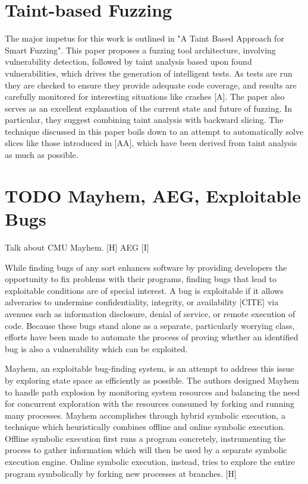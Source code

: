\documentclass[11pt,expanded,copyright]{fsuthesis}
\begin{document}
\section{Taint-based Fuzzing}

The major impetus for this work is outlined in "A Taint Based Approach for Smart Fuzzing". This paper proposes a fuzzing tool architecture, involving vulnerability detection, followed by taint analysis based upon found vulnerabilities, which drives the generation of intelligent tests. As tests are run they are checked to ensure they provide adequate code coverage, and results are carefully monitored for interesting situations like crashes [A]. The paper also serves as an excellent explanation of the current state and future of fuzzing. In particular, they suggest combining taint analysis with backward slicing. The technique discussed in this paper boils down to an attempt to automatically solve slices like those introduced in [AA], which have been derived from taint analysis as much as possible.

\section{TODO Mayhem, AEG, Exploitable Bugs}

Talk about CMU Mayhem. [H]
AEG [I]

While finding bugs of any sort enhances software by providing developers the opportunity to fix problems with their programs, finding bugs that lead to exploitable conditions are of special interest. A bug is exploitable if it allows adveraries to undermine confidentiality, integrity, or availability [CITE] via avenues such as information disclosure, denial of service, or remote execution of code. Because these bugs stand alone as a separate, particularly worrying class, efforts have been made to automate the process of proving whether an identified bug is also a vulnerability which can be exploited.

Mayhem, an exploitable bug-finding system, is an attempt to address this issue by exploring state space as efficiently as possible. The authors designed Mayhem to handle path explosion by monitoring system resources and balancing the need for concurrent exploration with the resources consumed by forking and running many processes. Mayhem accomplishes through hybrid symbolic execution, a technique which heuristically combines offline and online symbolic execution. Offline symbolic execution first runs a program concretely, instrumenting the process to gather information which will then be used by a separate symbolic execution engine. Online symbolic execution, instead, tries to explore the entire program symbolically by forking new processes at branches. [H]
\end{document}

